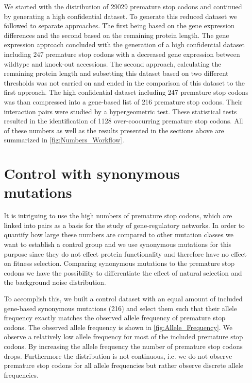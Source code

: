 We started with the distribution of 29029 premature stop codons and continued by generating a high confidential dataset. To generate this reduced dataset we followed to separate approaches. The first being based on the gene expression differences and the second based on the remaining protein length. The gene expression approach concluded with the generation of a high confidential dataset including 247 premature stop codons with a decreased gene expression between wildtype and knock-out accessions. The second approach, calculating the remaining protein length and subsetting this dataset based on two different thresholds was not carried on and ended in the comparison of this dataset to the first approach. The high confidential dataset including 247 premature stop codons was than compressed into a gene-based list of 216 premature stop codons. Their interaction pairs were studied by a hypergeometric test. These statistical tests resulted in the identification of 1128 over-coocurring premature stop codons. All of these numbers as well as the results presented in the sections above are summarized in \autoref{fig:Numbers_Workflow}. 

\section{Control with synonymous mutations}
\label{sec:Results_Control}
It is intriguing to use the high numbers of premature stop codons, which are linked into pairs as a basis for the study of gene-regulatory networks. In order to quantify how large these numbers are compared to other mutation classes we want to establish a control group and we use synonymous mutations for this purpose since they do not effect protein functionality and therefore have no effect on fitness selection. Comparing synonymous mutations to the premature stop codons we have the possibility to differentiate the effect of natural selection and the background noise distribution.

To accomplish this, we built a control dataset with an equal amount of included gene-based synonymous mutations (216) and select them such that their allele frequency exactly matches the observed allele frequency of premature stop codons. The observed allele frequency is shown in \autoref{fig:Allele_Frequency}. We observe a relatively low allele frequency for most of the included premature stop codons. By increasing the allele frequency the number of premature stop codons drops. Furthermore the distribution is not continuous, i.e. we do not observe premature stop codons for all allele frequencies but rather observe discrete allele frequencies.

